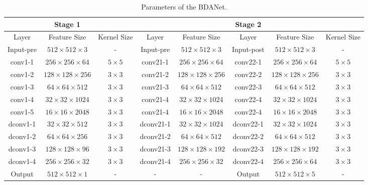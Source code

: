 \documentclass[journal]{IEEEtran}
\begin{document}
\begin{table*}[!t]
	\centering
	\caption{Parameters of the BDANet.}
	\setlength{\tabcolsep}{2.5mm} {
	\begin{tabular}{ccc|ccccc}
		\hline \hline
		& Stage 1 & & & & Stage 2 & & \\
		\hline
		Layer  &  Feature Size &  Kernel Size & Layer  &  Feature Size  & Layer & Feature Size & Kernel Size\\
		\hline
		Input-pre &  $512\times512\times3$ & - & Input-pre & $512\times 512 \times 3$  & Input-post & $512\times 512 \times 3$  & - \\
		conv1-1 & $256\times256\times64$ & $5\times5$ & conv21-1 &$256\times256\times64$ & conv22-1  & $256\times256\times64$ & $5\times5$\\
		conv1-2 &  $128\times128\times256$ & $3\times3$  & conv21-2 & $128\times128\times256$ & conv22-2 & $128\times128\times256$ & $3\times3$\\
		conv1-3 &  $64\times64\times512$ & $3\times3$  & conv21-3 & $64\times64\times512$ & conv22-3 & $64\times64\times512$  & $3\times3$\\
		conv1-4 &  $32\times32\times1024$ & $3\times3$  & conv21-4 &  $32\times32\times1024$ & conv22-4 &  $32\times32\times1024$  & $3\times3$\\
		conv1-5 &  $16\times16\times2048$ & $3\times3$  & conv21-4 &  $16\times16\times2048$ & conv22-4 &  $16\times16\times2048$  & $3\times3$\\
		dconv1-1 &  $32\times32\times512$ & $3\times3$  & dconv21-1 &  $32\times32\times1024$ & dconv22-1 &  $32\times32\times1024$  & $3\times3$\\
		dconv1-2 &  $64\times64\times256$ & $3\times3$  & dconv21-2 &  $64\times64\times512$ & dconv22-2 &  $64\times64\times512$  & $3\times3$\\
		dconv1-3 &  $128\times128\times96$ & $3\times3$  & dconv21-3 &  $128\times128\times192$  & dconv22-3 &  $128\times128\times192$  & $3\times3$\\
		dconv1-4 &  $256\times256\times32$ & $3\times3$  & dconv21-4 &  $256\times256\times32$  & dconv22-4 &  $256\times256\times64$  & $3\times3$\\
		Output &  $512\times512\times1$ & - & - & - & Output & $512\times 512 \times 5$  & - \\
\hline	\hline	
	\end{tabular}}
	\label{tabParameters}
\end{table*}
\end{document}
